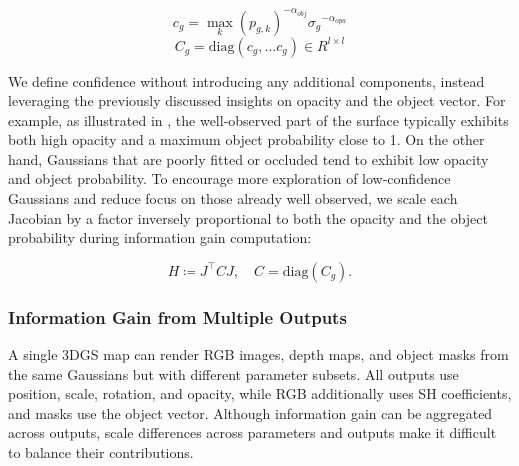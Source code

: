 
{\small
\begin{equation}
c_g=\max_k(p_{g,k})^{-\alpha_{obj}}{\sigma_g}^{-\alpha_{opa}}
\end{equation}
\begin{equation}
C_g=\text{diag}(c_g,...c_g) \in R^{l \times l}
\end{equation}
}

We define confidence without introducing any additional components, instead leveraging the previously discussed insights on opacity and the object vector. For example, as illustrated in , the well-observed part of the surface typically exhibits both high opacity and a maximum object probability close to 1. On the other hand, Gaussians that are poorly fitted or occluded tend to exhibit low opacity and object probability. To encourage more exploration of low-confidence Gaussians and reduce focus on those already well observed, we scale each Jacobian by a factor inversely proportional to both the opacity and the object probability during information gain computation:

{\small
\begin{equation}
H \coloneq J^\top C J, \quad C = \text{diag}(C_g).
\end{equation}
}


\subsubsection{Information Gain from Multiple Outputs}
A single 3DGS map can render RGB images, depth maps, and object masks from the same Gaussians but with different parameter subsets. All outputs use position, scale, rotation, and opacity, while RGB additionally uses SH coefficients, and masks use the object vector. Although information gain can be aggregated across outputs, scale differences across parameters and outputs make it difficult to balance their contributions.

